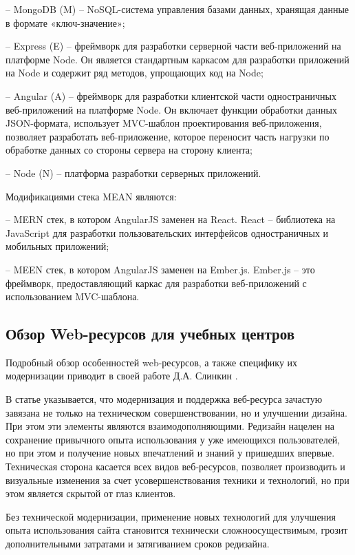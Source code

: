 -- MongoDB (M) -- NoSQL-система управления базами данных, хранящая данные в формате «ключ-значение»;

-- Express (E) -- фреймворк для разработки серверной части веб-приложений на платформе Node.
Он является стандартным каркасом для разработки приложений на Node и содержит ряд методов, упрощающих код на Node;

-- Angular (A) -- фреймворк для разработки клиентской части одностраничных веб-приложений на платформе Node.
Он включает функции обработки данных JSON-формата, использует MVC-шаблон проектирования веб-приложения, позволяет разработать веб-приложение, которое переносит часть нагрузки по обработке данных со стороны сервера на сторону клиента;

-- Node (N) -- платформа разработки серверных приложений.

Модификациями стека MEAN являются:

-- MERN стек, в котором AngularJS заменен на React.
React -- библиотека на JavaScript для разработки пользовательских интерфейсов одностраничных и мобильных приложений;

-- MEEN стек, в котором AngularJS заменен на Ember.js.
Ember.js -- это фреймворк, предоставляющий каркас для разработки веб-приложений с использованием MVC-шаблона.


\subsection{Обзор Web-ресурсов для учебных центров}

Подробный обзор особенностей web-ресурсов, а также специфику их модернизации приводит в своей работе Д.А. Слинкин \cite{slinkin-sovremennie}.

В статье указывается, что модернизация и поддержка веб-ресурса зачастую завязана не только на техническом совершенствовании, но и улучшении дизайна.
При этом эти элементы являются взаимодополняющими.
Редизайн нацелен на сохранение привычного опыта использования у уже имеющихся пользователей, но при этом и получение новых впечатлений и знаний у пришедших впервые.
Техническая сторона касается всех видов веб-ресурсов, позволяет производить и визуальные изменения за счет усовершенствования техники и технологий, но при этом является скрытой от глаз клиентов.

Без технической модернизации, применение новых технологий для улучшения опыта использования сайта становится технически сложноосуществимым, грозит дополнительными затратами и затягиванием сроков редизайна.


